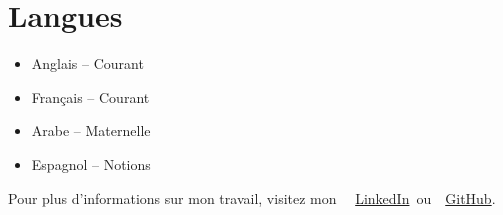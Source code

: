 \documentclass[10pt,a4paper,sans]{moderncv}
\begin{document}
\vspace{-17pt}
\section{\fontsize{11.2}{13}\selectfont Langues}
\vspace{-17pt}
\begin{multicols}{2}
\begin{itemize}[leftmargin=0.3cm, itemsep=0pt, topsep=0pt, partopsep=0pt, parsep=0pt]
      \item Anglais – Courant
      \item Français – Courant
      \item Arabe – Maternelle
      \item Espagnol – Notions
\end{itemize}
\end{multicols}



\vspace{-20pt}
\begin{center}
    {\fontsize{9}{11}\selectfont\color{gray}
    Pour plus d'informations sur mon travail, visitez mon~
    \faLinkedin~\href{https://www.linkedin.com/in/ahmed-makroum/}{LinkedIn}~ou~\faGithub~\href{https://github.com/ahmedmakroum}{GitHub}.}
\end{center}
\end{document}
